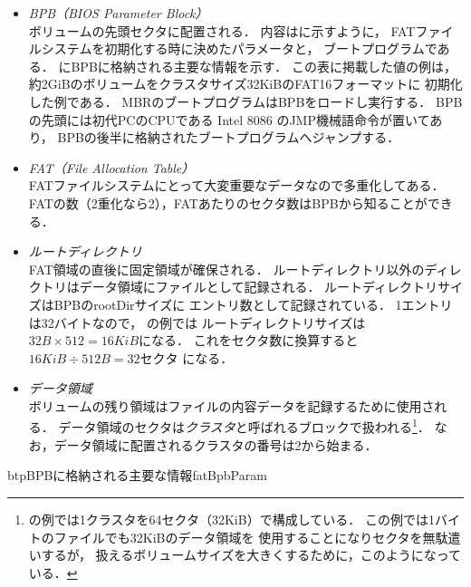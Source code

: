 \begin{itemize}
\item \emph{BPB（BIOS Parameter Block）}\\
  ボリュームの先頭セクタに配置される．
  内容はに示すように，
  FATファイルシステムを初期化する時に決めたパラメータと，
  ブートプログラムである．
  にBPBに格納される主要な情報を示す．
  この表に掲載した値の例は，
  約2GiBのボリュームをクラスタサイズ32KiBのFAT16フォーマットに
  初期化した例である．
  MBRのブートプログラムはBPBをロードし実行する．
  BPBの先頭には初代PCのCPUである Intel 8086 のJMP機械語命令が置いてあり，
  BPBの後半に格納されたブートプログラムへジャンプする．

\item \emph{FAT（File Allocation Table）}\\
  FATファイルシステムにとって大変重要なデータなので多重化してある．
  FATの数（2重化なら2），FATあたりのセクタ数はBPBから知ることができる．

\item \emph{ルートディレクトリ}\\
  FAT領域の直後に固定領域が確保される．
  ルートディレクトリ以外のディレクトリはデータ領域にファイルとして記録される．
  ルートディレクトリサイズはBPBのrootDirサイズに
  エントリ数として記録されている．
  1エントリは32バイトなので，
  の例では
  ルートディレクトリサイズは$32B \times 512 = 16KiB$になる．
  これをセクタ数に換算すると$16KiB \div 512B = 32セクタ$ になる．

\item \emph{データ領域}\\
  ボリュームの残り領域はファイルの内容データを記録するために使用される．
  データ領域のセクタは\emph{クラスタ}と呼ばれるブロックで扱われる\footnote{
    の例では1クラスタを64セクタ（32KiB）で構成している．
    この例では1バイトのファイルでも32KiBのデータ領域を
    使用することになりセクタを無駄遣いするが，
    扱えるボリュームサイズを大きくするために，このようになっている．}．
  なお，データ領域に配置されるクラスタの番号は2から始まる．
\end{itemize}

\begin{mytable}{btp}{BPBに格納される主要な情報}{fatBpbParam}
\end{mytable}

